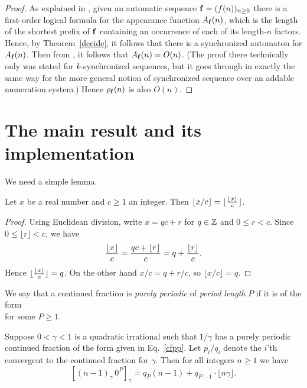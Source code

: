 \documentclass[12pt,reqno]{article}
\begin{document}
\begin{proof}
As explained in 
\cite[\S 10.5]{Shallit:2023}, given an automatic sequence ${\bf f} = (f(n))_{n \geq 0}$
there is a first-order logical formula for the
appearance function $A_{\bf f}(n)$, which is the length of the
shortest prefix of $\bf f$ containing an occurrence of each of its length-$n$
factors.  Hence, by Theorem~\ref{decide}, it follows that there is a
synchronized automaton for $A_{\bf f}(n)$.  Then from 
\cite[Thm.~8]{Shallit:2021h}, it follows that $A_{\bf f}(n) = O(n)$.  (The
proof there technically only was stated for $k$-synchronized sequences,
but it goes through in exactly the same way for the more general
notion of synchronized sequence over an addable numeration
system.)  Hence $\rho_{\bf f}(n)$ is also $O(n)$.
\end{proof}


\section{The main result and its implementation}
\label{main}

We need a simple lemma.
\begin{lemma}
Let $x$ be a real number and $c \geq 1$ an integer.
Then $\lfloor x/c \rfloor = \lfloor {{\lfloor x \rfloor} \over c} \rfloor$.
\label{simple}
\end{lemma}

\begin{proof}
Using Euclidean division, write $x = qc + r$ for $q \in \mathbb{Z}$ and
$0 \leq r < c$.   Since $0 \leq \lfloor r \rfloor < c$, we have
\begin{equation}
{{\lfloor x \rfloor}\over c} = {{qc + \lfloor r \rfloor} \over c} \\
= q + {{\lfloor r \rfloor } \over c} .
\end{equation}
Hence 
$\lfloor {{\lfloor x \rfloor} \over c} \rfloor = q$.
On the other hand $x/c = q + r/c$, so
$\lfloor x/c \rfloor = q$.
\end{proof}

We say that a continued fraction is {\it purely periodic\/} of
{\it period length\/} $P$ if it is of the form
\begin{equation}
[a_1, a_2, \ldots, a_P, a_1, a_2, \ldots, a_P, a_1, a_2, \ldots, a_P,
\ldots]
\label{cfpp}
\end{equation}
for some $P \geq 1$.  

\begin{theorem}
Suppose $0 < \gamma < 1$ is a quadratic irrational
such that $1/\gamma$ has a purely periodic continued
fraction of the form given in Eq.~\eqref{cfpp}. 
Let $p_i/q_i$ denote the $i$'th convergent to the
continued fraction for $\gamma$.
Then for all integers $n\geq 1$ we have
$$[ (n-1)_\gamma\, 0^P ]_\gamma = q_{P} (n-1) + q_{P-1} \cdot
\lfloor n \gamma \rfloor  .$$
\label{thm4}
\end{theorem}
\end{document}
